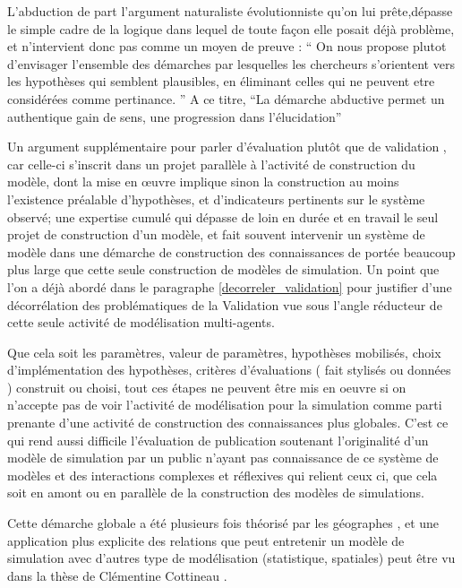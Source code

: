 L'abduction de part l'argument naturaliste évolutionniste qu'on lui prête,dépasse le simple cadre de la logique dans lequel de toute façon elle posait déjà problème, et n'intervient donc pas comme un moyen de preuve : \enquote{ On nous propose plutot d’envisager l’ensemble des démarches par lesquelles les chercheurs s’orientent vers les hypothèses qui semblent plausibles, en éliminant celles qui ne peuvent etre considérées comme pertinance. } A ce titre, \enquote{La démarche abductive permet un authentique gain de sens, une progression dans l’élucidation}

Un argument supplémentaire pour parler d'évaluation plutôt que de validation \autocite{Amblard2006}, car celle-ci s'inscrit dans un projet parallèle à l'activité de construction du modèle, dont la mise en œuvre implique sinon la construction au moins l'existence préalable d'hypothèses, et d'indicateurs pertinents sur le système observé; une expertise cumulé qui dépasse de loin en durée et en travail le seul projet de construction d'un modèle, et fait souvent intervenir un système de modèle dans une démarche de construction des connaissances de portée beaucoup plus large que cette seule construction de modèles de simulation. Un point que l'on a déjà abordé dans le paragraphe \ref{decorreler_validation} pour justifier d'une décorrélation des problématiques de la Validation vue sous l'angle réducteur de cette seule activité de modélisation multi-agents.

Que cela soit les paramètres, valeur de paramètres, hypothèses mobilisés, choix d'implémentation des hypothèses, critères d'évaluations ( fait stylisés ou données ) construit ou choisi, tout ces étapes ne peuvent être mis en oeuvre si on n'accepte pas de voir l'activité de modélisation pour la simulation comme parti prenante d'une activité de construction des connaissances plus globales. C'est ce qui rend aussi difficile l'évaluation de publication soutenant l'originalité d'un modèle de simulation par un public n'ayant pas connaissance de ce système de modèles et des interactions complexes et réflexives qui relient ceux ci, que cela soit en amont ou en parallèle de la construction des modèles de simulations.

Cette démarche globale a été plusieurs fois théorisé par les géographes \autocites{Besse2000, Sanders2000, Mathian2014}, et une application plus explicite des relations que peut entretenir un modèle de simulation avec d'autres type de modélisation (statistique, spatiales) peut être vu dans la thèse de Clémentine Cottineau \autocite{Cottineau2014a, Cottineau2014b}. 

